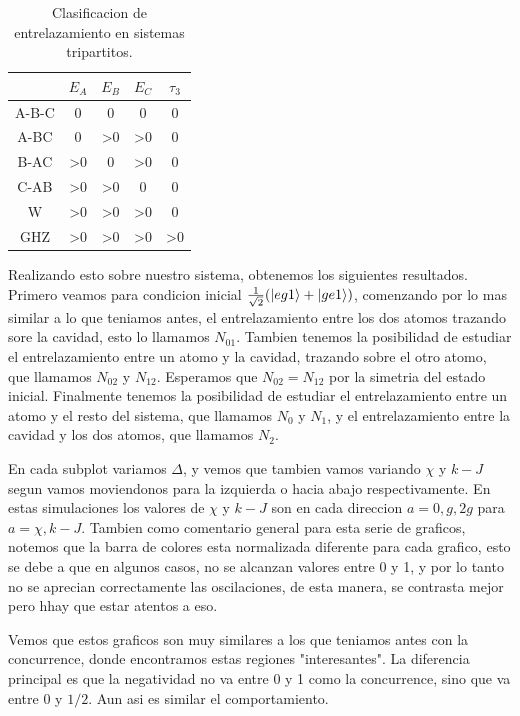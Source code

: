 \begin{table}
    \centering
    \begin{tabular}{|c|c|c|c|c|}
    \hline
         & $E_A$ & $E_B$ & $E_C$ & $\tau_3$ \\
         \hline
         A-B-C & 0 & 0 & 0 & 0 \\
         \hline
         A-BC & 0 & >0 & >0 & 0\\
         \hline
         B-AC & >0 & 0 & >0 & 0\\
         \hline
         C-AB & >0 & >0 & 0 & 0\\
         \hline
         W & >0 & >0 & >0 & 0\\
         \hline
         GHZ & >0 & >0 & >0 & >0\\
    \hline
    \end{tabular}
    \caption{Clasificacion de entrelazamiento en sistemas tripartitos.}
    \label{tab:entrelazamiento_tripartito}
\end{table}
Realizando esto sobre nuestro sistema, obtenemos los siguientes resultados.
Primero veamos para condicion inicial $\frac{1}{\sqrt{2}}(\ket{eg1}+\ket{ge1})$, comenzando por lo mas similar a lo que teniamos antes, el entrelazamiento entre los dos atomos trazando sore la cavidad, esto lo llamamos $N_{01}$. Tambien tenemos la posibilidad de estudiar el entrelazamiento entre un atomo y la cavidad, trazando sobre el otro atomo, que llamamos $N_{02}$ y $N_{12}$. Esperamos que $N_{02}=N_{12}$ por la simetria del estado inicial. Finalmente tenemos la posibilidad de estudiar el entrelazamiento entre un atomo y el resto del sistema, que llamamos $N_0$ y $N_1$, y el entrelazamiento entre la cavidad y los dos atomos, que llamamos $N_2$.

En cada subplot variamos $\Delta$, y vemos que tambien vamos variando $\chi$ y $k-J$ segun vamos moviendonos para la izquierda o hacia abajo respectivamente. En estas simulaciones los valores de $\chi$ y $k-J$ son en cada direccion $a=0,g,2g$ para $a=\chi,k-J$. Tambien como comentario general para esta serie de graficos, notemos que la barra de colores esta normalizada diferente para cada grafico, esto se debe a que en algunos casos, no se alcanzan valores entre 0 y 1, y por lo tanto no se aprecian correctamente las oscilaciones, de esta manera, se contrasta mejor pero hhay que estar atentos a eso.
\begin{figure}
    \centering
    \texttt{[image: figuras/ch2/negatividad/3x3 eg1+ \$N\_\{01]}$ 012 012.png}
    \caption{Negatividad $N_{01}$ para condicion inicial $\frac{1}{\sqrt{2}}(\ket{eg1}+\ket{ge1})$.}
    \label{fig2:N_01_eg1+}
\end{figure}
Vemos que estos graficos son muy similares a los que teniamos antes con la concurrence, donde encontramos estas regiones "interesantes". La diferencia principal es que la negatividad no va entre 0 y 1 como la concurrence, sino que va entre 0 y $1/2$. Aun asi es similar el comportamiento.  
\begin{figure}
    \centering
    \texttt{[image: figuras/ch2/negatividad/3x3 eg1+ \$N\_\{02]}$ 012 012.png}
    \caption{Negatividad $N_{02}$ para condicion inicial $\frac{1}{\sqrt{2}}(\ket{eg1}+\ket{ge1})$.}
    \label{fig2:N_02_eg1+}
\end{figure}

